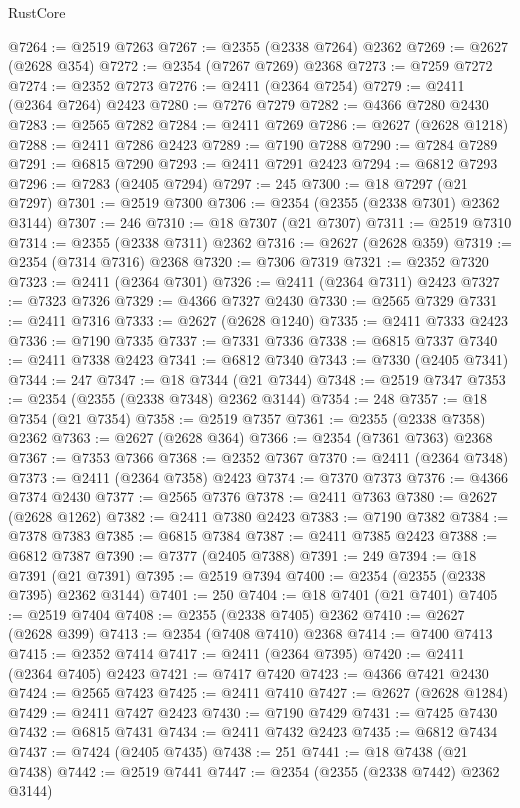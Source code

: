 \begin{lexlean}{RustCore}
\begin{coremodule}
@7264 := @2519 @7263
@7267 := @2355 (@2338 @7264) @2362
@7269 := @2627 (@2628 @354)
@7272 := @2354 (@7267 @7269) @2368
@7273 := @7259 @7272
@7274 := @2352 @7273
@7276 := @2411 (@2364 @7254)
@7279 := @2411 (@2364 @7264) @2423
@7280 := @7276 @7279
@7282 := @4366 @7280 @2430
@7283 := @2565 @7282
@7284 := @2411 @7269
@7286 := @2627 (@2628 @1218)
@7288 := @2411 @7286 @2423
@7289 := @7190 @7288
@7290 := @7284 @7289
@7291 := @6815 @7290
@7293 := @2411 @7291 @2423
@7294 := @6812 @7293
@7296 := @7283 (@2405 @7294)
@7297 := 245
@7300 := @18 @7297 (@21 @7297)
@7301 := @2519 @7300
@7306 := @2354 (@2355 (@2338 @7301) @2362 @3144)
@7307 := 246
@7310 := @18 @7307 (@21 @7307)
@7311 := @2519 @7310
@7314 := @2355 (@2338 @7311) @2362
@7316 := @2627 (@2628 @359)
@7319 := @2354 (@7314 @7316) @2368
@7320 := @7306 @7319
@7321 := @2352 @7320
@7323 := @2411 (@2364 @7301)
@7326 := @2411 (@2364 @7311) @2423
@7327 := @7323 @7326
@7329 := @4366 @7327 @2430
@7330 := @2565 @7329
@7331 := @2411 @7316
@7333 := @2627 (@2628 @1240)
@7335 := @2411 @7333 @2423
@7336 := @7190 @7335
@7337 := @7331 @7336
@7338 := @6815 @7337
@7340 := @2411 @7338 @2423
@7341 := @6812 @7340
@7343 := @7330 (@2405 @7341)
@7344 := 247
@7347 := @18 @7344 (@21 @7344)
@7348 := @2519 @7347
@7353 := @2354 (@2355 (@2338 @7348) @2362 @3144)
@7354 := 248
@7357 := @18 @7354 (@21 @7354)
@7358 := @2519 @7357
@7361 := @2355 (@2338 @7358) @2362
@7363 := @2627 (@2628 @364)
@7366 := @2354 (@7361 @7363) @2368
@7367 := @7353 @7366
@7368 := @2352 @7367
@7370 := @2411 (@2364 @7348)
@7373 := @2411 (@2364 @7358) @2423
@7374 := @7370 @7373
@7376 := @4366 @7374 @2430
@7377 := @2565 @7376
@7378 := @2411 @7363
@7380 := @2627 (@2628 @1262)
@7382 := @2411 @7380 @2423
@7383 := @7190 @7382
@7384 := @7378 @7383
@7385 := @6815 @7384
@7387 := @2411 @7385 @2423
@7388 := @6812 @7387
@7390 := @7377 (@2405 @7388)
@7391 := 249
@7394 := @18 @7391 (@21 @7391)
@7395 := @2519 @7394
@7400 := @2354 (@2355 (@2338 @7395) @2362 @3144)
@7401 := 250
@7404 := @18 @7401 (@21 @7401)
@7405 := @2519 @7404
@7408 := @2355 (@2338 @7405) @2362
@7410 := @2627 (@2628 @399)
@7413 := @2354 (@7408 @7410) @2368
@7414 := @7400 @7413
@7415 := @2352 @7414
@7417 := @2411 (@2364 @7395)
@7420 := @2411 (@2364 @7405) @2423
@7421 := @7417 @7420
@7423 := @4366 @7421 @2430
@7424 := @2565 @7423
@7425 := @2411 @7410
@7427 := @2627 (@2628 @1284)
@7429 := @2411 @7427 @2423
@7430 := @7190 @7429
@7431 := @7425 @7430
@7432 := @6815 @7431
@7434 := @2411 @7432 @2423
@7435 := @6812 @7434
@7437 := @7424 (@2405 @7435)
@7438 := 251
@7441 := @18 @7438 (@21 @7438)
@7442 := @2519 @7441
@7447 := @2354 (@2355 (@2338 @7442) @2362 @3144)

\end{coremodule}
\end{lexlean}
